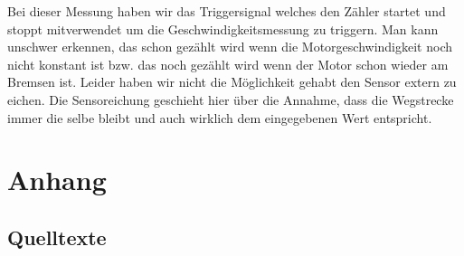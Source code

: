 \documentclass[12pt]{article}
\begin{document}
Bei dieser Messung haben wir das Triggersignal welches den Zähler startet und stoppt mitverwendet um die Geschwindigkeitsmessung zu triggern.
Man kann unschwer erkennen, das schon gezählt wird wenn die Motorgeschwindigkeit noch nicht konstant ist bzw. das noch gezählt wird wenn der Motor schon wieder am Bremsen ist. Leider haben wir nicht die Möglichkeit gehabt den Sensor extern zu eichen. Die Sensoreichung geschieht hier über die Annahme, dass
die Wegstrecke immer die selbe bleibt und auch wirklich dem eingegebenen Wert entspricht.

\section{Anhang}

\subsection{Quelltexte}






\end{document}
